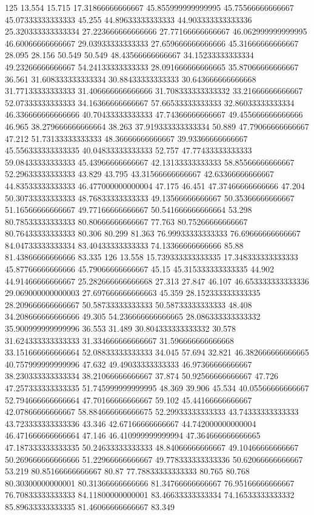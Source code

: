 125 13.554 15.715 17.31866666666667 45.855999999999995 45.75566666666667 45.07333333333333 45.255 44.89633333333333 44.903333333333336 25.320333333333334 27.223666666666666 27.77166666666667 46.062999999999995 46.60066666666667 29.03933333333333 27.659666666666666 45.31666666666667 28.095 28.156 50.549 50.549 48.43566666666667 34.15233333333334 49.23266666666667 54.24133333333333 28.091666666666665 35.87066666666667 36.561 31.608333333333334 30.88433333333333 30.643666666666668 31.77133333333333 31.406666666666666 31.708333333333332 33.21666666666667 52.07333333333333 34.16366666666667 57.66533333333333 32.86033333333334 46.336666666666666 40.70433333333333 47.74366666666667 49.455666666666666 46.965 38.279666666666664 38.263 37.919333333333334 50.889 47.79066666666667 47.212 51.73133333333333 48.36666666666667 39.93366666666667 45.556333333333335 40.04833333333333 52.757 47.77433333333333 59.08433333333333 45.43966666666667 42.13133333333333 58.85566666666667 52.29633333333333 43.829 43.795 43.31566666666667 42.63366666666667 44.83533333333333 46.477000000000004 47.175 46.451 47.37466666666666 47.204 50.30733333333333 48.76833333333333 49.13566666666667 50.35366666666667 51.16566666666667 49.77166666666667 50.541666666666664 53.298 80.78533333333333 80.80666666666667 77.763 80.75266666666667 80.76433333333333 80.306 80.299 81.363 76.99933333333333 76.69666666666667 84.04733333333334 83.40433333333333 74.13366666666666 85.88 81.43866666666666 83.335
126 13.558 15.739333333333335 17.348333333333333 45.87766666666666 45.79066666666667 45.15 45.315333333333335 44.902 44.91466666666667 25.282666666666668 27.313 27.847 46.107 46.653333333333336 29.069000000000003 27.697666666666663 45.359 28.152333333333335 28.209666666666667 50.58733333333333 50.58733333333333 48.408 34.208666666666666 49.305 54.236666666666665 28.086333333333332 35.900999999999996 36.553 31.489 30.804333333333332 30.578 31.624333333333333 31.334666666666667 31.596666666666668 33.151666666666664 52.08833333333333 34.045 57.694 32.821 46.382666666666665 40.757999999999996 47.632 49.49033333333333 46.97366666666667 38.230333333333334 38.21066666666667 37.874 50.92566666666667 47.726 47.257333333333335 51.745999999999995 48.369 39.906 45.534 40.05566666666667 52.794666666666664 47.70166666666667 59.102 45.44166666666667 42.07866666666667 58.884666666666675 52.29933333333333 43.74333333333333 43.723333333333336 43.346 42.67166666666667 44.742000000000004 46.471666666666664 47.146 46.410999999999994 47.364666666666665 47.187333333333335 50.24633333333333 48.84066666666667 49.10466666666667 50.269666666666666 51.22966666666667 49.778333333333336 50.62066666666667 53.219 80.85166666666667 80.87 77.78833333333333 80.765 80.768 80.30300000000001 80.31366666666666 81.34766666666667 76.95166666666667 76.70833333333333 84.11800000000001 83.46633333333334 74.16533333333332 85.89633333333335 81.46066666666667 83.349
